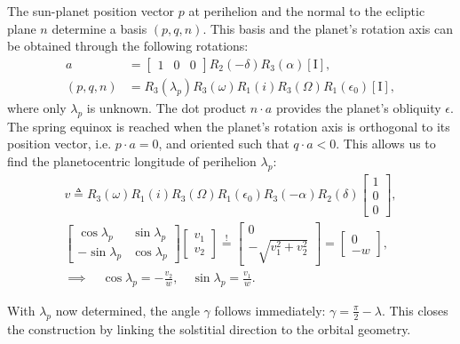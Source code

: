 \documentclass[12pt]{article}
\begin{document}
The sun-planet position vector $p$ at perihelion and the normal to the ecliptic
plane $n$ determine a basis $(p,q,n)$. This basis and the planet's rotation axis
can be obtained through the following rotations:
\begin{align}
    a &= 
    \begin{bmatrix}
        1 & 0 & 0
    \end{bmatrix}
    R_2(-\delta) R_3(\alpha) [\mathrm{I}],\\
    (p,q,n) &= R_3(\lambda_p) 
        R_3(\omega) R_1(i) R_3(\Omega) R_1(\epsilon_0)
    [\mathrm{I}],
\end{align}
where only $\lambda_p$ is unknown. 
The dot product $n\cdot a$ provides the planet's obliquity $\epsilon$.
The spring equinox is reached when 
the planet's rotation axis is orthogonal to its position vector, i.e.
$p\cdot a=0$, and oriented such that $q \cdot a<0$. This allows us to find 
the planetocentric longitude of perihelion $\lambda_p$:
\begin{gather}
    v \triangleq R_3(\omega) R_1(i) R_3(\Omega) R_1(\epsilon_0) R_3(-\alpha) R_2(\delta)
    \begin{bmatrix}
        1\\
        0\\
        0
    \end{bmatrix},\\
    \begin{bmatrix}
        \cos \lambda_p & \sin \lambda_p\\
        -\sin \lambda_p & \cos \lambda_p
    \end{bmatrix}
    \begin{bmatrix}
        v_1\\
        v_2
    \end{bmatrix}
    \overset{!}{=}
    \begin{bmatrix}
        0\\
        -\sqrt{v_1^2+v_2^2}
    \end{bmatrix}
    = 
    \begin{bmatrix}
        0\\
        -w
    \end{bmatrix},\\[6pt]
    \implies \quad \cos \lambda_p = -\frac{v_2}{w}, \quad
    \sin \lambda_p = \frac{v_1}{w}.
\end{gather}

With $\lambda_p$ now determined, the angle $\gamma$ follows immediately:
$\gamma = \frac{\pi}{2} - \lambda$. This closes the construction by 
linking the solstitial direction to the orbital geometry.
\end{document}
